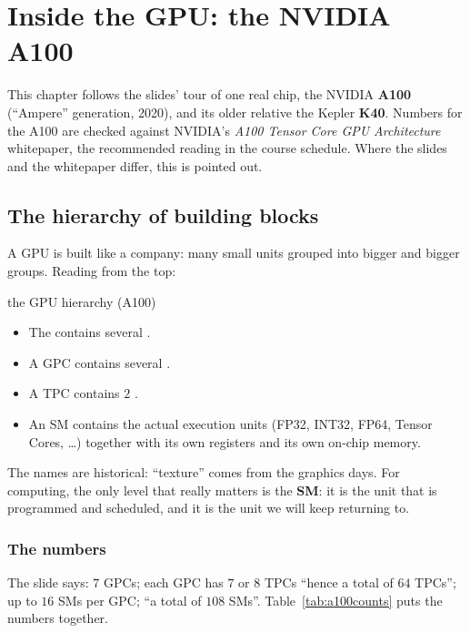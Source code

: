 \chapter{Inside the GPU: the NVIDIA A100}
\label{ch:a100}


This chapter follows the slides' tour of one real chip, the NVIDIA \textbf{A100} (``Ampere'' generation, 2020),
and its older relative the Kepler \textbf{K40}. Numbers for the A100 are checked against NVIDIA's
\emph{A100 Tensor Core GPU Architecture} whitepaper, the recommended reading in the course schedule. Where the slides and the
whitepaper differ, this is pointed out.

\section{The hierarchy of building blocks}


A GPU is built like a company: many small units grouped into bigger and bigger groups. Reading from the top:

\begin{definition}{the GPU hierarchy (A100)}
\begin{itemize}
  \item The  contains several .
  \item A GPC contains several .
  \item A TPC contains $2$ .
  \item An SM contains the actual execution units (FP32, INT32, FP64, Tensor Cores, \dots) together with its own registers and its own on-chip memory.
\end{itemize}
\end{definition}
The names are historical: ``texture'' comes from the graphics days. For computing, the only level
that really matters is the \textbf{SM}: it is the unit that is programmed and scheduled, and it is the unit
we will keep returning to.



\subsection{The numbers}

The slide says: $7$ GPCs; each GPC has $7$ or $8$ TPCs ``hence a total of $64$ TPCs''; up to $16$ SMs per GPC; ``a total of $108$ SMs''.
Table~\ref{tab:a100counts} puts the numbers together.

